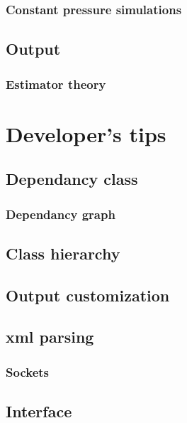 \documentclass[12pt,fleqn]{report}
\begin{document}
\subsection{Constant pressure simulations}
\section{Output}
\subsection{Estimator theory}

\chapter{Developer's tips}
\section{Dependancy class}
\subsection{Dependancy graph}
\section{Class hierarchy}
\section{Output customization}
\section{xml parsing}
\subsection{Sockets}
\section{Interface}

\begin{thebibliography}{99}
\end{thebibliography}
\end{document}
